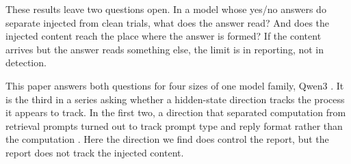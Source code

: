 \documentclass[11pt]{article}
\begin{document}
These results leave two questions open. In a model whose yes/no answers do separate injected from clean trials, what does the answer read? And does the injected content reach the place where the answer is formed? If the content arrives but the answer reads something else, the limit is in reporting, not in detection.

This paper answers both questions for four sizes of one model family, Qwen3 \citep{qwen3}. It is the third in a series asking whether a hidden-state direction tracks the process it appears to track. In the first two, a direction that separated computation from retrieval prompts turned out to track prompt type and reply format rather than the computation \citep{ramdan2026crv1,ramdan2026fingerprint,ramdan2026crv2}. Here the direction we find does control the report, but the report does not track the injected content.
\end{document}
